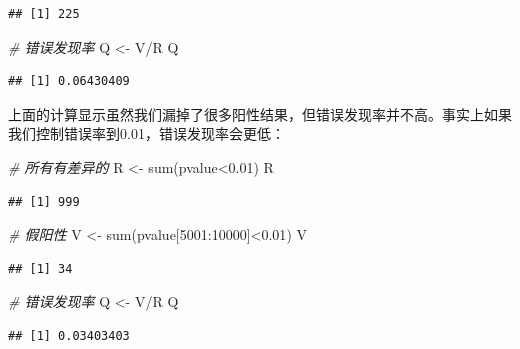\documentclass[]{tufte-book}
\newenvironment{Shaded}{}{}
\newcommand{\CommentTok}[1]{\textcolor[rgb]{0.38,0.63,0.69}{\textit{#1}}}
\newcommand{\DecValTok}[1]{\textcolor[rgb]{0.25,0.63,0.44}{#1}}
\newcommand{\FloatTok}[1]{\textcolor[rgb]{0.25,0.63,0.44}{#1}}
\newcommand{\FunctionTok}[1]{\textcolor[rgb]{0.02,0.16,0.49}{#1}}
\newcommand{\NormalTok}[1]{#1}
\newcommand{\OtherTok}[1]{\textcolor[rgb]{0.00,0.44,0.13}{#1}}
\newcommand{\SpecialCharTok}[1]{\textcolor[rgb]{0.25,0.44,0.63}{#1}}
\begin{document}
\begin{verbatim}
## [1] 225
\end{verbatim}

\begin{Shaded}
\begin{Highlighting}[]
\CommentTok{\# 错误发现率}
\NormalTok{Q }\OtherTok{\textless{}{-}}\NormalTok{ V}\SpecialCharTok{/}\NormalTok{R}
\NormalTok{Q}
\end{Highlighting}
\end{Shaded}

\begin{verbatim}
## [1] 0.06430409
\end{verbatim}

上面的计算显示虽然我们漏掉了很多阳性结果，但错误发现率并不高。事实上如果我们控制错误率到0.01，错误发现率会更低：

\begin{Shaded}
\begin{Highlighting}[]
\CommentTok{\# 所有有差异的}
\NormalTok{R }\OtherTok{\textless{}{-}} \FunctionTok{sum}\NormalTok{(pvalue}\SpecialCharTok{\textless{}}\FloatTok{0.01}\NormalTok{)}
\NormalTok{R}
\end{Highlighting}
\end{Shaded}

\begin{verbatim}
## [1] 999
\end{verbatim}

\begin{Shaded}
\begin{Highlighting}[]
\CommentTok{\# 假阳性}
\NormalTok{V }\OtherTok{\textless{}{-}} \FunctionTok{sum}\NormalTok{(pvalue[}\DecValTok{5001}\SpecialCharTok{:}\DecValTok{10000}\NormalTok{]}\SpecialCharTok{\textless{}}\FloatTok{0.01}\NormalTok{)}
\NormalTok{V}
\end{Highlighting}
\end{Shaded}

\begin{verbatim}
## [1] 34
\end{verbatim}

\begin{Shaded}
\begin{Highlighting}[]
\CommentTok{\# 错误发现率}
\NormalTok{Q }\OtherTok{\textless{}{-}}\NormalTok{ V}\SpecialCharTok{/}\NormalTok{R}
\NormalTok{Q}
\end{Highlighting}
\end{Shaded}

\begin{verbatim}
## [1] 0.03403403
\end{verbatim}
\end{document}

